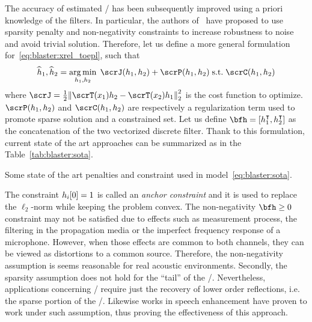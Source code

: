 \mynewline
The accuracy of estimated \RIRs/ has been subsequently improved using a priori knowledge of the filters.
In particular, the authors of~ have proposed to use sparsity penalty and non-negativity constraints to increase robustness to noise and avoid trivial solution.
Therefore, let us define a more general formulation for~\cref{eq:blaster:xrel_toepl}, such that
\begin{equation}\label{eq:blaster:sota}
    \disFilterHat_1, \disFilterHat_2
    =
    \kargmin_{\disFilter_1, \disFilter_2}
    \;
    \scrJ(\disFilter_1, \disFilter_2) + \scrP(\disFilter_1, \disFilter_2)
    \;\text{s.t.}\;
    \scrC(\disFilter_1, \disFilter_2)
\end{equation}
where $\scrJ = \tfrac{1}{2} \kvvbar{\scrT(\disRecordedSignal_1) \disFilter_2 - \scrT(\disRecordedSignal_2) \disFilter_1}_2^2$ is the cost function to optimize.
$\scrP(\disFilter_1, \disFilter_2)$ and $\scrC(\disFilter_1, \disFilter_2)$ are respectively a regularization term used to promote sparse solution and a constrained set.
Let us define $\bfh = \klist{h_1^\intercal, h_2^\intercal}$ as the concatenation of the two vectorized discrete filter.
Thank to this formulation, current state of the art approaches can be summarized as in the Table~\cref{tab:blaster:sota}.

\begin{table}[!h]

    \begin{fullwidth}
        \centering
        \small
        

        \caption{Some state of the art penalties and constraint used in model~\cref{eq:blaster:sota}.}
        \label{tab:blaster:sota}
    \end{fullwidth}
\end{table}

\noindent The constraint $h_i[0]=1$ is called an \textit{anchor constraint} and it is used to replace the $\ell_2$-norm while keeping the problem convex.
The non-negativity $\bfh \geq 0$ constraint may not be satisfied due to effects such as measurement process, the filtering in the propagation media or the imperfect frequency response of a microphone.
However, when those effects are common to both channels, they can be viewed as distortions to a common source.
Therefore, the non-negativity assumption is seems reasonable for real acoustic environments.
Secondly, the sparsity assumption does not hold for the ``tail'' of the \RIR/.
Nevertheless, applications concerning \RooGE/ require just the recovery of lower order reflections, i.e. the sparse portion of the \RIR/.
Likewise works in speech enhancement have proven to work under such assumption, thus proving the effectiveness of this approach.

